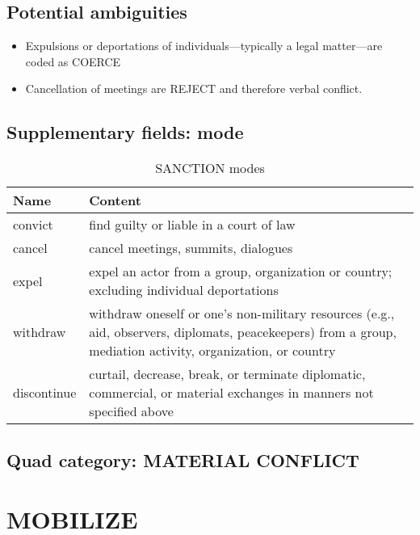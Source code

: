 \documentclass[11pt]{report}
\newcommand{\plcat}[1]{\textsf{#1}}
\begin{document}
\subsection{Potential ambiguities}

\begin{itemize}
\item Expulsions or deportations of individuals---typically a legal matter---are coded as \plcat{COERCE} 
\item Cancellation of meetings are \plcat{REJECT} and therefore verbal conflict.
\end{itemize}

\subsection{Supplementary fields: mode}

\begin{table}[htp]
\caption{SANCTION modes}
\begin{center}
\begin{tabular}{|l|p{13cm}|}
\hline
Name & Content \\
\hline
convict & find guilty or liable in a court of law\\
cancel & cancel meetings, summits, dialogues  \\
expel & expel an actor from a group, organization or country; excluding individual deportations \\
withdraw & withdraw oneself or one's non-military resources (e.g., aid, observers, diplomats, peacekeepers) from a group, mediation activity, organization, or country\\
discontinue & curtail, decrease, break, or terminate diplomatic, commercial, or material exchanges in manners not specified above \\
\hline
\end{tabular}
\end{center}
\label{tab:sanctionmode}
\end{table}%

\subsection{Quad category: MATERIAL CONFLICT}

\newpage  

\section{MOBILIZE}
\end{document}
